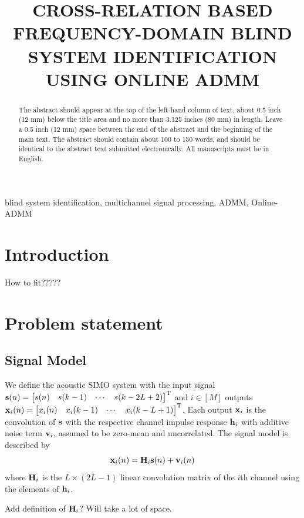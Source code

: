 \documentclass{article}
\title{CROSS-RELATION BASED FREQUENCY-DOMAIN BLIND SYSTEM IDENTIFICATION USING ONLINE ADMM}
\newcommand{\h}{\mtxb{h}}
\newcommand{\x}{\mtxb{x}}
\begin{document}
%
\maketitle
%
\begin{abstract}
The abstract should appear at the top of the left-hand column of text, about 0.5 inch (12 mm) below the title area and no more than 3.125 inches (80 mm) in length.
Leave a 0.5 inch (12 mm) space between the end of the abstract and the beginning of the main text.
The abstract should contain about 100 to 150 words, and should be identical to the abstract text submitted electronically.
All manuscripts must be in English.
\end{abstract}
%
\begin{keywords}
blind system identification, multichannel signal processing, ADMM, Online-ADMM
\end{keywords}
%
\section{Introduction}
\label{sec:intro}
\begin{attention}
    How to fit?????
\end{attention}


\section{Problem statement}
\label{sec:problem_statement}


\subsection{Signal Model}
\label{ssec:signal_model}
We define the acoustic SIMO system with the input signal \(\bm{\mathrm{s}}(n) = \begin{bmatrix}
    s(n)&s(k-1)&\cdots&s(k-2L+2)
\end{bmatrix}^{{\mathrm{T}}}\) and \(i \in [M]\) outputs 
\(
    \x_i(n) = \begin{bmatrix}
        x_i(n)&x_i(k-1)&\cdots&x_i(k-L+1)
    \end{bmatrix}^{\T}
\).
Each output \(\x_i\) is the convolution of \(\bm{\mathrm{s}}\) with the respective channel impulse response \(\h_i\) with additive noise term \(\bm{\mathrm{v}}_i\), assumed to be zero-mean and uncorrelated.
The signal model is described by
\begin{equation}
    \x_i(n) = \mtxb{H}_i \mtxb{s}(n) + \mtxb{v}_i(n)
\end{equation}
where \(\bm{\mathrm{H}}_i\) is the \(L \times (2L-1)\) linear convolution matrix of the \(i\)th channel using the elements of \(\h_i\).
\begin{note}
    Add definition of \(\bm{\mathrm{H}}_i\)? Will take a lot of space.
\end{note}
\end{document}
